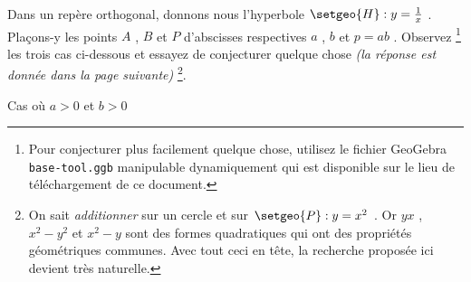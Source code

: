 Dans un repère orthogonal, donnons nous l'hyperbole $\setgeo{H} : y = \frac{1}{x}$ . Plaçons-y les points $A$ , $B$ et $P$ d'abscisses respectives $a$ , $b$ et  $p = ab$ .
Observez
\footnote{
	Pour conjecturer plus facilement quelque chose, utilisez le fichier GeoGebra \texttt{base-tool.ggb} manipulable dynamiquement qui est disponible sur le lieu de téléchargement de ce document.
}
les trois cas ci-dessous et essayez de conjecturer quelque chose \emph{(la réponse est donnée dans la page suivante)}
\footnote{
	On sait \emph{\og additionner \fg} sur un cercle et sur $\setgeo{P} : y = x^2$ .
	Or $yx$ , $x^2 - y^2$ et $x^2 - y$ sont des formes quadratiques qui ont des propriétés géométriques communes.
	Avec tout ceci en tête, la recherche proposée ici devient très naturelle.
}.


\begin{center}
	\footnotesize
	\itshape

	
	\smallskip
	Cas où $a > 0$ et $b > 0$

	\medskip
	
	

\end{center}

